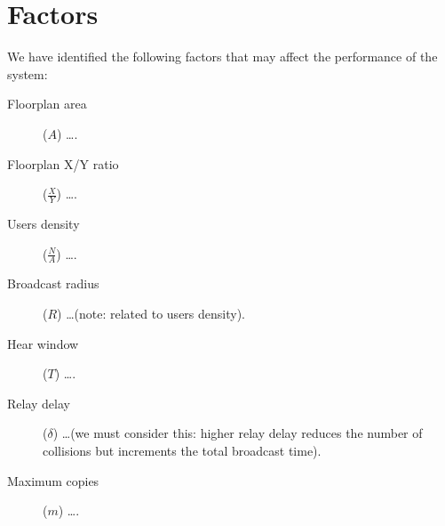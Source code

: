 \section{Factors}\label{sec:factors}

We have identified the following factors that may affect the performance of the
system:
\begin{description}
	\item[Floorplan area] (\(A\)) \ldots.
	\item[Floorplan X/Y ratio] (\(\frac{X}{Y}\)) \ldots.
	\item[Users density] (\(\frac{N}{A}\)) \ldots.
	\item[Broadcast radius] (\(R\)) \ldots (note: related to users density).
	\item[Hear window] (\(T\)) \ldots.
	\item[Relay delay] (\(\delta\)) \ldots (we must consider this: higher
		relay delay reduces the number of collisions but increments the
		total broadcast time).
	\item[Maximum copies] (\(m\)) \ldots.
\end{description}
